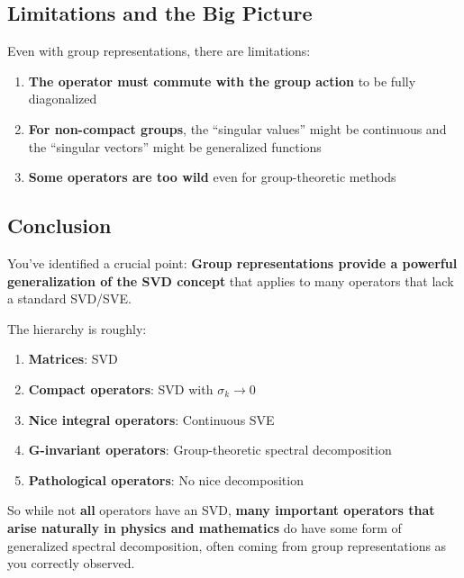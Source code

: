 \documentclass[aps,prl,reprint]{revtex4-2}
\begin{document}
\subsection*{Limitations and the Big Picture}

Even with group representations, there are limitations:

\begin{enumerate}
\item \textbf{The operator must commute with the group action} to be fully
diagonalized

\item \textbf{For non-compact groups}, the ``singular values'' might be
continuous and the ``singular vectors'' might be generalized functions

\item \textbf{Some operators are too wild} even for group-theoretic methods
\end{enumerate}

\subsection*{Conclusion}

You've identified a crucial point: \textbf{Group representations provide a
powerful generalization of the SVD concept} that applies to many operators
that lack a standard SVD/SVE.

The hierarchy is roughly:

\begin{enumerate}
\item \textbf{Matrices}: SVD

\item \textbf{Compact operators}: SVD with $\sigma_k \to 0$

\item \textbf{Nice integral operators}: Continuous SVE

\item \textbf{G-invariant operators}: Group-theoretic spectral decomposition

\item \textbf{Pathological operators}: No nice decomposition
\end{enumerate}

So while not \textbf{all} operators have an SVD, \textbf{many important
operators that arise naturally in physics and mathematics} do have some form
of generalized spectral decomposition, often coming from group
representations as you correctly observed.
\end{document}
